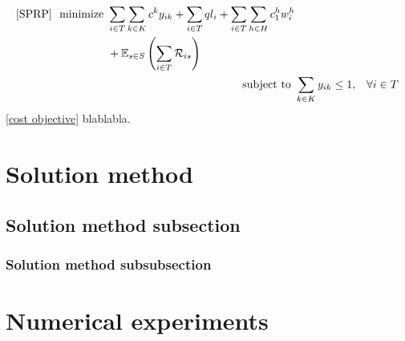 \documentclass[3p, review]{elsarticle}
\begin{document}
\begin{subequations} \label{MODEL SPRP}
        \renewcommand{\theequation}{\theparentequation.\arabic{equation}}
\begin{align} 
\label{cost objective}
\begin{split}
        \text{[SPRP] ~minimize~}
        & \sum_{i \in T} \sum_{k \in K} c^k y_{ik}
        + \sum_{i \in T} q l_i
        + \sum_{i \in T} \sum_{h \in {H}} c_1^h w_i^h \\
        & + \mathbb{E}_{s \in S} \left(\sum_{i \in T}\mathcal{R}_{is}\right)
\end{split} \\
\label{constraint}
\text{subject to~}
        & \sum_{k \in K} y_{ik} \leq 1, 
        & \forall i \in T
\end{align}
\end{subequations}
\eqref{cost objective} blablabla.


\section{Solution method} \label{SEC: Solution method}

\subsection{Solution method subsection} \label{SUBSEC: Solution method subsection}

\subsubsection{Solution method subsubsection} \label{SUBSUBSEC: Solution method subsubsection}

\section{Numerical experiments}\label{SEC: Numerical experiments}
\end{document}
